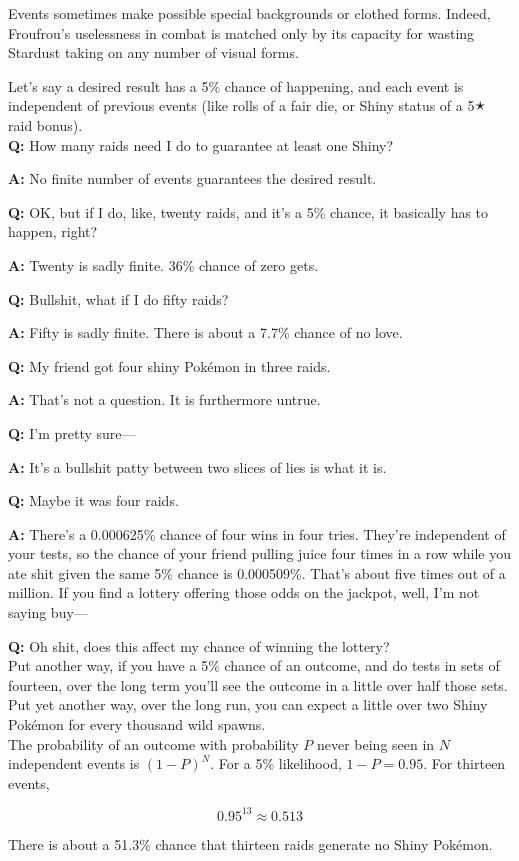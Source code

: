 Events sometimes make possible special backgrounds or clothed forms.
Indeed, Froufrou's uselessness in combat is matched only by its
  capacity for wasting Stardust taking on any number of visual forms.

\begin{tcolorbox}[enhanced,title=An aside regarding independent events,halign title=flush center]
Let's say a desired result has a 5\% chance of happening, and each event is independent of previous events (like rolls of a fair die, or Shiny status of a 5🟉 raid bonus).\\

\textbf{Q:} How many raids need I do to guarantee at least one Shiny?

\textbf{A:} No finite number of events guarantees the desired result.

\textbf{Q:} OK, but if I do, like, twenty raids, and it's a 5\% chance, it basically has to happen, right?

\textbf{A:} Twenty is sadly finite. 36\% chance of zero gets.

\textbf{Q:} Bullshit, what if I do fifty raids?

\textbf{A:} Fifty is sadly finite. There is about a 7.7\% chance of no love.

\textbf{Q:} My friend got four shiny Pokémon in three raids.

\textbf{A:} That's not a question. It is furthermore untrue.

\textbf{Q:} I'm pretty sure---

\textbf{A:} It's a bullshit patty between two slices of lies is what it is.

\textbf{Q:} Maybe it was four raids.

\textbf{A:} There's a 0.000625\% chance of four wins in four tries. They're independent of your tests,
             so the chance of your friend pulling juice four times in a row while you ate shit given
             the same 5\% chance is 0.000509\%. That's about five times out of a million.
             If you find a lottery offering those odds on the jackpot, well, I'm not saying buy---

\textbf{Q:} Oh shit, does this affect my chance of winning the lottery?\\

Put another way, if you have a 5\% chance of an outcome, and do tests in sets of fourteen,
 over the long term you'll see the outcome in a little over half those sets.
Put yet another way, over the long run, you can expect a little over two Shiny
 Pokémon for every thousand wild spawns.\\

The probability of an outcome with probability $P$ never being seen in $N$ independent
  events is ${(1 - P)}^N$. For a 5\% likelihood, $1 - P = 0.95$. For thirteen events,

  \[ 0.95^{13} ≈ 0.513 \]

There is about a 51.3\% chance that thirteen raids generate no Shiny Pokémon.
\end{tcolorbox}
